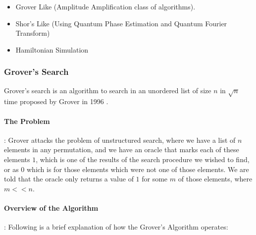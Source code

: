 \begin{itemize}
    \item Grover Like (Amplitude Amplification class of algorithms).
    \item Shor's Like (Using Quantum Phase Estimation and Quantum Fourier Transform)
    \item Hamiltonian Simulation 
\end{itemize}

\subsubsection{Grover's Search}

Grover's search is an algorithm to search in an unordered list of size $n$ in $\sqrt{n}$ time proposed by Grover in 1996 \cite{grover-search-original}.

\paragraph*{The Problem}: Grover attacks the problem of unstructured search, where we have a list of $n$ elements in any permutation, and we have an oracle that marks each of these elements $1$, which is one of the results of the search procedure we wished to find, or as $0$ which is for those elements which were not one of those elements. We are told that the oracle only returns a value of $1$ for some $m$ of those elements, where $m << n$.

\paragraph*{Overview of the Algorithm}: Following is a brief explanation of how the Grover's Algorithm operates:

